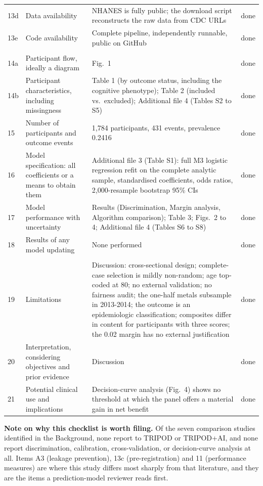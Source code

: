 \documentclass[10pt]{article}
\begin{document}
\begin{longtable}{C{0.7cm}L{4.3cm}L{9cm}C{1.2cm}}
13d & Data availability & NHANES is fully public; the download script reconstructs the raw data from CDC URLs & done \\
13e & Code availability & Complete pipeline, independently runnable, public on GitHub & done \\
\addlinespace
{} \\
14a & Participant flow, ideally a diagram & Fig.~1 & done \\
14b & Participant characteristics, including missingness & Table 1 (by outcome status, including the cognitive phenotype); Table 2 (included vs.\ excluded); Additional file 4 (Tables S2 to S5) & done \\
15 & Number of participants and outcome events & 1,784 participants, 431 events, prevalence 0.2416 & done \\
16 & Model specification: all coefficients or a means to obtain them & Additional file 3 (Table S1): full M3 logistic regression refit on the complete analytic sample, standardised coefficients, odds ratios, 2,000-resample bootstrap 95\% CIs & done \\
17 & Model performance with uncertainty & Results (Discrimination, Margin analysis, Algorithm comparison); Table 3; Figs.~2 to 4; Additional file 4 (Tables S6 to S8) & done \\
18 & Results of any model updating & None performed & done \\
\addlinespace
{} \\
19 & Limitations & Discussion: cross-sectional design; complete-case selection is mildly non-random; age top-coded at 80; no external validation; no fairness audit; the one-half metals subsample in 2013-2014; the outcome is an epidemiologic classification; composites differ in content for participants with three scores; the 0.02 margin has no external justification & done \\
20 & Interpretation, considering objectives and prior evidence & Discussion & done \\
21 & Potential clinical use and implications & Decision-curve analysis (Fig.~4) shows no threshold at which the panel offers a material gain in net benefit & done \\
\end{longtable}

\bigskip

\textbf{Note on why this checklist is worth filing.} Of the seven comparison studies identified in the Background, none report to TRIPOD or TRIPOD+AI, and none report discrimination, calibration, cross-validation, or decision-curve analysis at all. Items A3 (leakage prevention), 13c (pre-registration) and 11 (performance measures) are where this study differs most sharply from that literature, and they are the items a prediction-model reviewer reads first.
\end{document}
